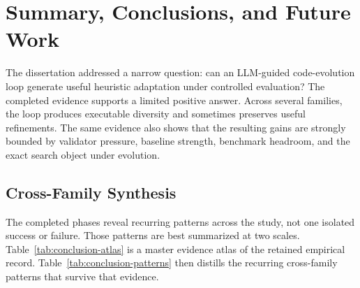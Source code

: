 \chapter{Summary, Conclusions, and Future Work}
\label{chap:conclusion}

The dissertation addressed a narrow question: can an LLM-guided code-evolution loop generate
useful heuristic adaptation under controlled evaluation? The completed evidence supports a
limited positive answer. Across several families, the loop produces executable diversity and sometimes
preserves useful refinements. The same evidence also shows that the resulting gains are strongly
bounded by validator pressure, baseline strength, benchmark headroom, and the exact search object
under evolution.

\section{Cross-Family Synthesis}
\label{sec:conclusion-synthesis}

The completed phases reveal recurring patterns across the study, not one isolated success or failure. Those
patterns are best summarized at two scales. Table~\ref{tab:conclusion-atlas} is a master evidence
atlas of the retained empirical record. Table~\ref{tab:conclusion-patterns} then distills the
recurring cross-family patterns that survive that evidence.

